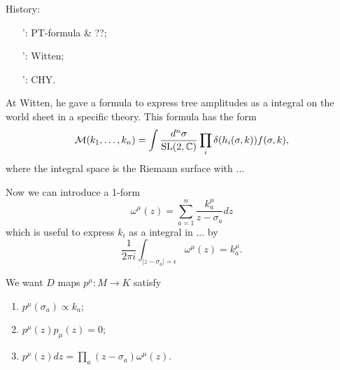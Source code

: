 
History:

\begin{itemize}
    \item [\qquad\qquad 80':] PT-formula \& ??;
    \item [\qquad\qquad 03':] Witten;
    \item [\qquad\qquad 13':] CHY.
\end{itemize}

At Witten, he gave a formula to express tree amplitudes as a 
integral on the world sheet in a specific theory. This formula 
has the form
\[
    \mathcal M(k_1,\dots,k_n)=\int \frac{d^n\sigma}
    {\operatorname{SL}(2,\mathbb{C})}\prod_i\delta(h_i(\sigma,k))f(\sigma,k),
\]
where the integral space is the Riemann surface with ...

Now we can introduce a 1-form 
\[
    \omega^\mu(z)=\sum_{a=1}^n \frac{k_a^\mu}{z-\sigma_a}dz
\]
which is useful to express $k_i$ as a integral in ... by
\[
    \frac{1}{2\pi i}\int_{|z-\sigma_a|=\epsilon}\omega^\mu(z)
    =k_a^\mu.
\]

We want $D$ maps $p^\mu:M\to K$ satisfy
\begin{enumerate}
    \item $p^\mu(\sigma_a) \propto k_a$;
    \item $p^\mu(z) p_\mu(z) = 0$;
    \item $p^\mu(z) dz = \prod_a (z-\sigma_a)\omega^\mu(z)$.
\end{enumerate}